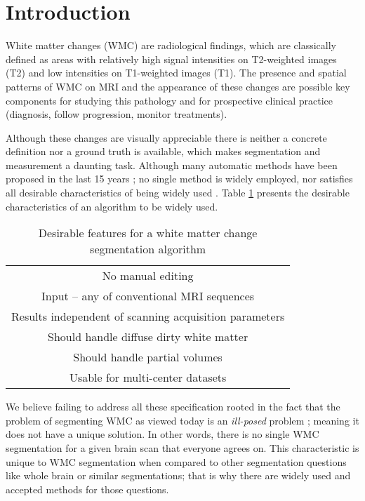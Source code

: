 \section{Introduction} \label{intro}


White matter changes (WMC) are radiological findings, which are classically defined as areas with relatively high signal intensities on T2-weighted images (T2) and low intensities on T1-weighted images (T1). The presence and spatial patterns of WMC on MRI and the appearance of these changes are possible key components for studying this pathology and for prospective clinical practice (diagnosis, follow progression, monitor treatments).

Although these changes are visually appreciable there is neither a concrete definition nor a ground truth is available, which makes segmentation and measurement a daunting task. Although many automatic methods have been proposed in the last 15 years \cite{Kamber_1995} \cite{Udupa_1997} \cite{10695813}\cite{12585710}\cite{19766196}; no single method is widely employed, nor satisfies all desirable characteristics of being widely used \cite{GarciaReview}. Table \ref{Table:Requirements} presents the desirable characteristics of an algorithm to be widely used.

\begin{table}
\centering
    \begin{tabular}  {  c }
    \hline
        No manual editing \\ 
        Input – any of conventional MRI sequences \\ 
        Results independent of scanning acquisition parameters \\ 
        Should handle diffuse dirty white matter \\ 
        Should handle partial volumes \\ 
        Usable for multi-center datasets \\
    \hline
    \end{tabular} 
    \caption{Desirable features for a white matter change segmentation algorithm } 
    \label{Table:Requirements}
\end{table}
    
We believe failing to address all these specification rooted in the fact that the problem of segmenting WMC as viewed today is an \textit{ill-posed} problem \cite{IllPosed}; meaning it does not have a unique solution. In other words, there is no single WMC segmentation for a given brain scan that everyone agrees on. This characteristic is unique to WMC segmentation when compared to other segmentation questions like whole brain or similar segmentations; that is why there are widely used and accepted methods for those questions.


